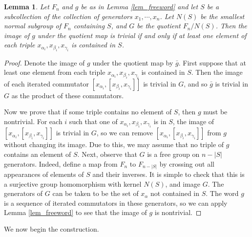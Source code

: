 \documentclass[12pt]{amsart}
\newtheorem{lemma}[thm]{Lemma}
\theoremstyle{definition}
\theoremstyle{remark}
\begin{document}
\begin{lemma}
Let $F_n$ and $g$ be as in Lemma \ref{lem_freeword} and let $S$ be a subcollection of the collection of generators $x_1, \cdots, x_n$.
Let $N(S)$ be the smallest normal subgroup of $F_n$ containing $S$, and $G$ be the quotient $F_n / N(S)$.
Then the image of $g$ under the quotient map is trivial if and only if at least one element of each triple $x_{\alpha_i},x_{\beta_i},x_{\gamma_i}$ is contained in $S$.
\label{lem_clauselinkage}
\end{lemma}
\begin{proof}
Denote the image of $g$ under the quotient map by $\bar g$.
First suppose that at least one element from each triple $x_{\alpha_i},x_{\beta_i},x_{\gamma_i}$ is contained in $S$.
Then the image of each iterated commutator $[x_{\alpha_i}, [ x_{\beta_i}, x_{\gamma_i}]]$ is trivial in $G$, and so $\bar g$ is trivial in $G$ as the product of these commutators.

Now we prove that if some triple contains no element of $S$, then $g$ must be nontrivial.
For each $i$ such that one of $x_{\alpha_i},x_{\beta_i},x_{\gamma_i}$ is in $S$, the image of $[x_{\alpha_i}, [ x_{\beta_i}, x_{\gamma_i}]]$ is trivial in $G$, so we can remove $[x_{\alpha_i}, [ x_{\beta_i}, x_{\gamma_i}]]$  from $g$ without changing its image.
Due to this, we may assume that no triple of $g$ contains an element of $S$.
Next, observe that $G$ is a free group on $n - |S|$ generators.
Indeed, define a map from $F_n$ to $F_{n-|S|}$ by crossing out all appearances of elements of $S$ and their inverses.
It is simple to check that this is a surjective group homomorphism with kernel $N(S)$, and image $G$.
The generators of $G$ can be taken to be the set of $x_\alpha$ not contained in $S$.
The word $g$ is a sequence of iterated commutators in these generators, so we can apply Lemma \ref{lem_freeword} to see that the image of $g$ is nontrivial.
\end{proof}

We now begin the construction.
\end{document}
